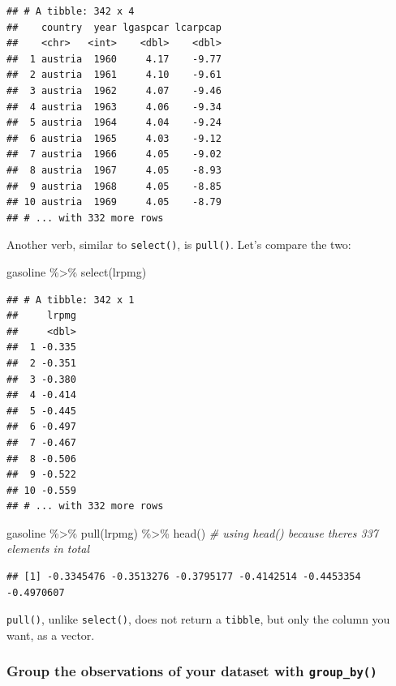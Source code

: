 \documentclass[
]{article}
\newenvironment{Shaded}{\begin{snugshade}}{\end{snugshade}}
\newcommand{\CommentTok}[1]{\textcolor[rgb]{0.56,0.35,0.01}{\textit{#1}}}
\newcommand{\FunctionTok}[1]{\textcolor[rgb]{0.00,0.00,0.00}{#1}}
\newcommand{\NormalTok}[1]{#1}
\newcommand{\SpecialCharTok}[1]{\textcolor[rgb]{0.00,0.00,0.00}{#1}}
\begin{document}
\begin{verbatim}
## # A tibble: 342 x 4
##    country  year lgaspcar lcarpcap
##    <chr>   <int>    <dbl>    <dbl>
##  1 austria  1960     4.17    -9.77
##  2 austria  1961     4.10    -9.61
##  3 austria  1962     4.07    -9.46
##  4 austria  1963     4.06    -9.34
##  5 austria  1964     4.04    -9.24
##  6 austria  1965     4.03    -9.12
##  7 austria  1966     4.05    -9.02
##  8 austria  1967     4.05    -8.93
##  9 austria  1968     4.05    -8.85
## 10 austria  1969     4.05    -8.79
## # ... with 332 more rows
\end{verbatim}

Another verb, similar to \texttt{select()}, is \texttt{pull()}. Let's compare the two:

\begin{Shaded}
\begin{Highlighting}[]
\NormalTok{gasoline }\SpecialCharTok{\%\textgreater{}\%}
  \FunctionTok{select}\NormalTok{(lrpmg)}
\end{Highlighting}
\end{Shaded}

\begin{verbatim}
## # A tibble: 342 x 1
##     lrpmg
##     <dbl>
##  1 -0.335
##  2 -0.351
##  3 -0.380
##  4 -0.414
##  5 -0.445
##  6 -0.497
##  7 -0.467
##  8 -0.506
##  9 -0.522
## 10 -0.559
## # ... with 332 more rows
\end{verbatim}

\begin{Shaded}
\begin{Highlighting}[]
\NormalTok{gasoline }\SpecialCharTok{\%\textgreater{}\%}
  \FunctionTok{pull}\NormalTok{(lrpmg) }\SpecialCharTok{\%\textgreater{}\%}
  \FunctionTok{head}\NormalTok{() }\CommentTok{\# using head() because there\textquotesingle{}s 337 elements in total}
\end{Highlighting}
\end{Shaded}

\begin{verbatim}
## [1] -0.3345476 -0.3513276 -0.3795177 -0.4142514 -0.4453354 -0.4970607
\end{verbatim}

\texttt{pull()}, unlike \texttt{select()}, does not return a \texttt{tibble}, but only the column you want, as a
vector.

\hypertarget{group-the-observations-of-your-dataset-with-group_by}{%
\subsubsection{\texorpdfstring{Group the observations of your dataset with \texttt{group\_by()}}{Group the observations of your dataset with group\_by()}}\label{group-the-observations-of-your-dataset-with-group_by}}
\end{document}
